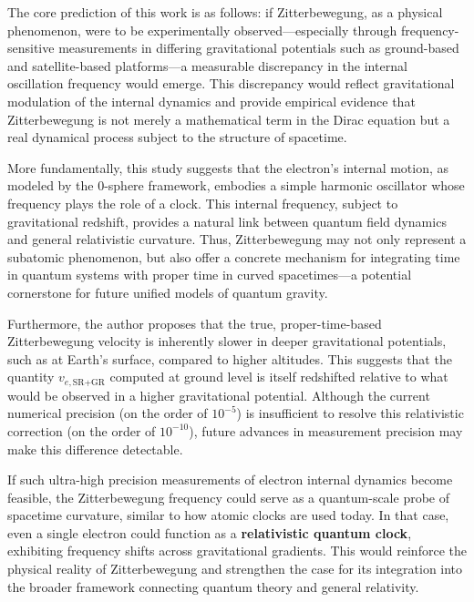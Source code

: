 \documentclass[%
 reprint,
 amsmath,amssymb,
 aps,
]{revtex4-1}
\numberwithin{equation}{section}%
\begin{document}
The core prediction of this work is as follows: if Zitterbewegung, as a physical phenomenon, were to be experimentally observed—especially through frequency-sensitive measurements in differing gravitational potentials such as ground-based and satellite-based platforms—a measurable discrepancy in the internal oscillation frequency would emerge. This discrepancy would reflect gravitational modulation of the internal dynamics and provide empirical evidence that Zitterbewegung is not merely a mathematical term in the Dirac equation but a real dynamical process subject to the structure of spacetime.

More fundamentally, this study suggests that the electron's internal motion, as modeled by the 0-sphere framework, embodies a simple harmonic oscillator whose frequency plays the role of a clock. This internal frequency, subject to gravitational redshift, provides a natural link between quantum field dynamics and general relativistic curvature. Thus, Zitterbewegung may not only represent a subatomic phenomenon, but also offer a concrete mechanism for integrating time in quantum systems with proper time in curved spacetimes—a potential cornerstone for future unified models of quantum gravity.

Furthermore, the author proposes that the true, proper-time-based Zitterbewegung velocity is inherently slower in deeper gravitational potentials, such as at Earth's surface, compared to higher altitudes. This suggests that the quantity $v_{e,\text{SR+GR}}$ computed at ground level is itself redshifted relative to what would be observed in a higher gravitational potential. Although the current numerical precision (on the order of $10^{-5}$) is insufficient to resolve this relativistic correction (on the order of $10^{-10}$), future advances in measurement precision may make this difference detectable.

If such ultra-high precision measurements of electron internal dynamics become feasible, the Zitterbewegung frequency could serve as a quantum-scale probe of spacetime curvature, similar to how atomic clocks are used today. In that case, even a single electron could function as a \textbf{relativistic quantum clock}, exhibiting frequency shifts across gravitational gradients. This would reinforce the physical reality of Zitterbewegung and strengthen the case for its integration into the broader framework connecting quantum theory and general relativity.
\end{document}

